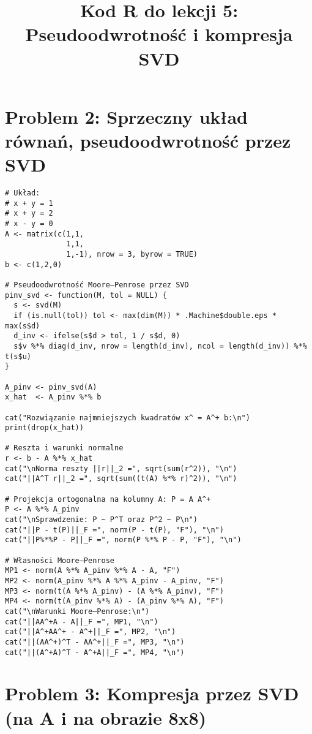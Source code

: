 \documentclass[12pt]{article}
\title{Kod R do lekcji 5: Pseudoodwrotność i kompresja SVD}
\author{}
\date{}
\begin{document}
\maketitle

\section*{Problem 2: Sprzeczny układ równań, pseudoodwrotność przez SVD}

\begin{lstlisting}
# Układ:
# x + y = 1
# x + y = 2
# x - y = 0
A <- matrix(c(1,1,
              1,1,
              1,-1), nrow = 3, byrow = TRUE)
b <- c(1,2,0)

# Pseudoodwrotność Moore–Penrose przez SVD
pinv_svd <- function(M, tol = NULL) {
  s <- svd(M)
  if (is.null(tol)) tol <- max(dim(M)) * .Machine$double.eps * max(s$d)
  d_inv <- ifelse(s$d > tol, 1 / s$d, 0)
  s$v %*% diag(d_inv, nrow = length(d_inv), ncol = length(d_inv)) %*% t(s$u)
}

A_pinv <- pinv_svd(A)
x_hat  <- A_pinv %*% b

cat("Rozwiązanie najmniejszych kwadratów x^ = A^+ b:\n")
print(drop(x_hat))

# Reszta i warunki normalne
r <- b - A %*% x_hat
cat("\nNorma reszty ||r||_2 =", sqrt(sum(r^2)), "\n")
cat("||A^T r||_2 =", sqrt(sum((t(A) %*% r)^2)), "\n")

# Projekcja ortogonalna na kolumny A: P = A A^+
P <- A %*% A_pinv
cat("\nSprawdzenie: P ~ P^T oraz P^2 ~ P\n")
cat("||P - t(P)||_F =", norm(P - t(P), "F"), "\n")
cat("||P%*%P - P||_F =", norm(P %*% P - P, "F"), "\n")

# Własności Moore–Penrose
MP1 <- norm(A %*% A_pinv %*% A - A, "F")
MP2 <- norm(A_pinv %*% A %*% A_pinv - A_pinv, "F")
MP3 <- norm(t(A %*% A_pinv) - (A %*% A_pinv), "F")
MP4 <- norm(t(A_pinv %*% A) - (A_pinv %*% A), "F")
cat("\nWarunki Moore–Penrose:\n")
cat("||AA^+A - A||_F =", MP1, "\n")
cat("||A^+AA^+ - A^+||_F =", MP2, "\n")
cat("||(AA^+)^T - AA^+||_F =", MP3, "\n")
cat("||(A^+A)^T - A^+A||_F =", MP4, "\n")
\end{lstlisting}

\section*{Problem 3: Kompresja przez SVD (na A i na obrazie 8x8)}
\end{document}
